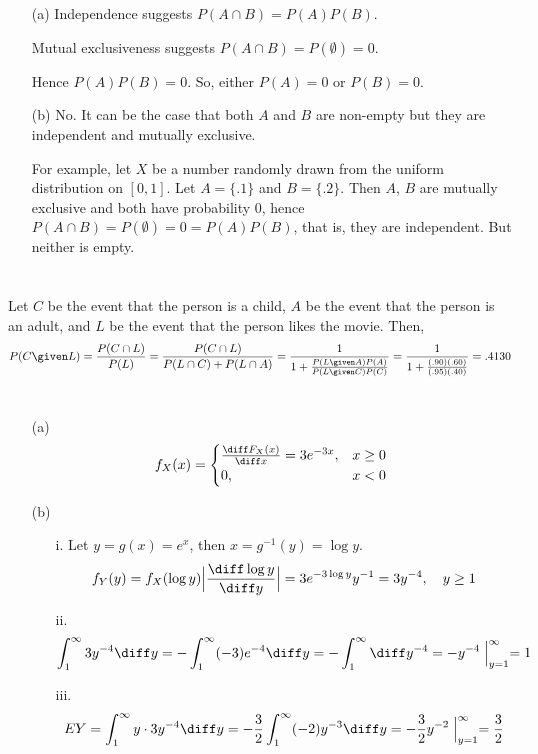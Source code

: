 \documentclass[12pt]{article}
\begin{document}
\section{}
\begin{enumerate}
\item[(a)]
Independence suggests
$P(A\cap B) = P(A)P(B)$.

Mutual exclusiveness suggests
$P(A\cap B) = P(\emptyset) = 0$.

Hence $P(A)P(B) = 0$.
So, either $P(A) = 0$ or $P(B) = 0$.

\item[(b)]
No. It can be the case that both $A$ and $B$ are non-empty but
they are independent and mutually exclusive.

For example,
let $X$ be a number randomly drawn from the uniform distribution on
$[0,1]$.
Let $A = \{.1\}$ and $B = \{.2\}$.
Then $A$, $B$ are mutually exclusive and both have probability 0,
hence $P(A\cap B) = P(\emptyset) = 0 = P(A)P(B)$, that is,
they are independent.
But neither is empty.
\end{enumerate}

\section{}
Let $C$ be the event that the person is a child,
$A$ be the event that the person is an adult,
and $L$ be the event that the person likes the movie.
Then,
\[
P(C\given L)
= \frac{P(C \cap L)}{P(L)}
= \frac{P(C \cap L)}
    {P(L \cap C) + P(L\cap A)}
= \frac{1}{1 + \frac{P(L\given A)P(A)}{P(L\given C)P(C)}}
= \frac{1}{1 + \frac{(.90)(.60)}{(.95)(.40)}}
= .4130
\]

\section{}

\begin{enumerate}
\item[(a)]
\[
f_X(x) = \begin{cases}
    \frac{\diff F_X(x)}{\diff x} = 3e^{-3x}, & x \ge 0\\
    0, & x < 0
\end{cases}
\]
\item[(b)]
\begin{enumerate}
\item[i.]
Let $y = g(x) = e^x$, then $x = g^{-1}(y) = \log y$.
\[
f_Y(y)
= f_X(\log y) \Bigl|\frac{\diff \log y}{\diff y}\Bigr|
= 3e^{-3\log y} y^{-1}
= 3y^{-4},
\quad y \ge 1
\]
\item[ii.]
\[
\int_1^\infty 3y^{-4} \diff y
= -\int_1^\infty (-3)e^{-4} \diff y
= -\int_1^\infty \diff y^{-4}
= -y^{-4}\Bigm|_{y=1}^\infty
= 1
\]
\item[iii.]
\[
E Y
= \int_1^\infty y\cdot 3y^{-4}\diff y
= -\frac{3}{2}\int_1^\infty (-2)y^{-3} \diff y
= -\frac{3}{2} y^{-2}\Bigm|_{y=1}^\infty
= \frac{3}{2}
\]
\end{enumerate}
\end{enumerate}
\end{document}
